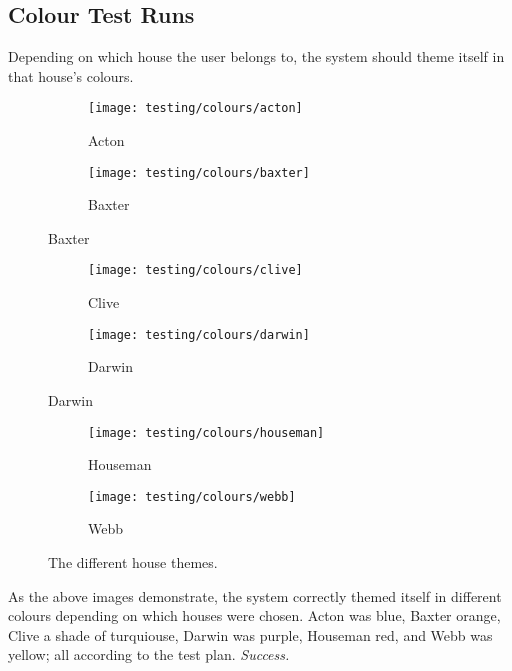\clearpage
\subsection{Colour Test Runs} %
\label{sub:colour_tests}
Depending on which house the user belongs to, the system should theme itself in that house's colours.

\begin{figure}[!htbp]
\centering
\begin{subfigure}{0.5\textwidth}
  \centering
  \texttt{[image: testing/colours/acton]}
  \caption{Acton}
  \label{fig:sub1}
\end{subfigure}%
\begin{subfigure}{0.5\textwidth}
  \centering
  \texttt{[image: testing/colours/baxter]}
  \caption{Baxter}
  \label{fig:sub2}
\end{subfigure}
\label{fig:test}
\end{figure}

\begin{figure}[!htbp]
\centering
\begin{subfigure}{0.5\textwidth}
  \centering
  \texttt{[image: testing/colours/clive]}
  \setcounter{subfigure}{2}%
  \caption{Clive}
  \label{fig:sub1}
\end{subfigure}%
\begin{subfigure}{0.5\textwidth}
  \centering
  \texttt{[image: testing/colours/darwin]}
  \setcounter{subfigure}{3}%
  \caption{Darwin}
  \label{fig:sub2}
\end{subfigure}
\label{fig:test}
\end{figure}

\begin{figure}[!htbp]
\centering
\begin{subfigure}{0.5\textwidth}
  \centering
  \texttt{[image: testing/colours/houseman]}
  \setcounter{subfigure}{4}%
  \caption{Houseman}
  \label{fig:sub1}
\end{subfigure}%
\begin{subfigure}{0.5\textwidth}
  \centering
  \texttt{[image: testing/colours/webb]}
  \setcounter{subfigure}{5}%
  \caption{Webb}
  \label{fig:sub2}
\end{subfigure}
\caption{The different house themes.}
\label{fig:test}
\end{figure}
As the above images demonstrate, the system correctly themed itself in different colours depending on which houses were chosen. Acton was blue, Baxter orange, Clive a shade of turquiouse, Darwin was purple, Houseman red, and Webb was yellow; all according to the test plan. \textit{Success.}
